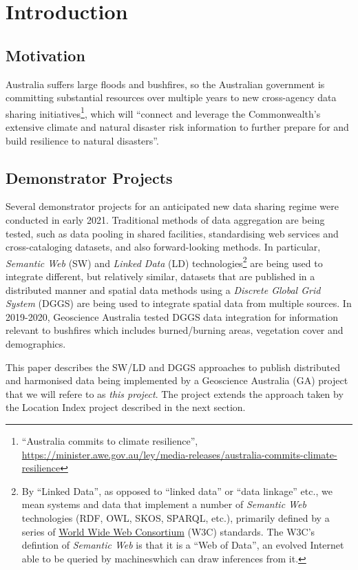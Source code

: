 \documentclass[runningheads]{llncs}
\begin{document}
\section{Introduction}\label{sec:introduction}
\subsection{Motivation}
Australia suffers large floods and bushfires, so the Australian government is committing substantial resources over 
multiple years to new cross-agency data sharing initiatives\footnote{``Australia commits to climate resilience'', 
\url{https://minister.awe.gov.au/ley/media-releases/australia-commits-climate-resilience}}, 
which will ``connect and leverage the Commonwealth’s extensive climate and natural disaster risk information to further prepare for and build resilience to natural disasters''.

\subsection{Demonstrator Projects}
Several demonstrator projects for an anticipated new data sharing regime were conducted in early 2021. 
Traditional methods of data aggregation are being tested, such as data pooling in shared facilities,
standardising web services and cross-cataloging datasets, and also forward-looking methods. In particular,
\textit{Semantic Web} (SW) and \textit{Linked Data} (LD) technologies\footnote{By ``Linked Data'', as opposed to ``linked data'' or ``data linkage'' etc.,
we mean systems and data that implement a number of \textit{Semantic Web} technologies (RDF, OWL, SKOS, SPARQL, etc.), primarily 
defined by a series of \href{https://www.w3.org/standards/semanticweb/data}{World Wide Web Consortium} (W3C) standards. The W3C's defintion of 
\textit{Semantic Web} is that it is a ``Web of Data'', an evolved Internet able to be queried by machineswhich can draw inferences from it.}
are being used to integrate different, but relatively similar, datasets that are published in a distributed manner and
spatial data methods using a \textit{Discrete Global Grid System} (DGGS) are being used to integrate spatial data from multiple sources. In 2019-2020, Geoscience Australia tested DGGS data integration
for information relevant to bushfires which includes burned/burning areas, vegetation cover and demographics.

This paper describes the SW/LD and DGGS approaches to publish distributed and harmonised data being implemented by a Geoscience Australia (GA) project that we will 
refere to as \textit{this project}. The project extends the approach taken by the Location Index project described in the next section.
\end{document}
